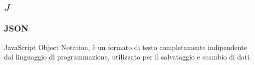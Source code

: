 \subsection*{\quad$J\quad$}
\subsubsection*{JSON}
JavaScript Object Notation, è un formato di testo completamente indipendente dal linguaggio di programmazione, utilizzato per il salvataggio e scambio di dati. 

